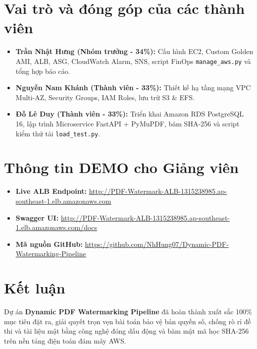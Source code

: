 \documentclass[12pt,a4paper]{report}
\begin{document}
\section{Vai trò và đóng góp của các thành viên}
\begin{itemize}
    \item \textbf{Trần Nhật Hưng (Nhóm trưởng - 34\%):} Cấu hình EC2, Custom Golden AMI, ALB, ASG, CloudWatch Alarm, SNS, script FinOps \texttt{manage\_aws.py} và tổng hợp báo cáo.
    \item \textbf{Nguyễn Nam Khánh (Thành viên - 33\%):} Thiết kế hạ tầng mạng VPC Multi-AZ, Security Groups, IAM Roles, lưu trữ S3 \& EFS.
    \item \textbf{Đỗ Lê Duy (Thành viên - 33\%):} Triển khai Amazon RDS PostgreSQL 16, lập trình Microservice FastAPI + PyMuPDF, băm SHA-256 và script kiểm thử tải \texttt{load\_test.py}.
\end{itemize}

\section{Thông tin DEMO cho Giảng viên}
\begin{itemize}
    \item \textbf{Live ALB Endpoint:} \url{http://PDF-Watermark-ALB-1315238985.ap-southeast-1.elb.amazonaws.com}
    \item \textbf{Swagger UI:} \url{http://PDF-Watermark-ALB-1315238985.ap-southeast-1.elb.amazonaws.com/docs}
    \item \textbf{Mã nguồn GitHub:} \url{https://github.com/NhHung07/Dynamic-PDF-Watermarking-Pipeline}
\end{itemize}

\section*{Kết luận}
Dự án \textbf{Dynamic PDF Watermarking Pipeline} đã hoàn thành xuất sắc 100\% mục tiêu đặt ra, giải quyết trọn vẹn bài toán bảo vệ bản quyền số, chống rò rỉ đề thi và tài liệu mật bằng công nghệ đóng dấu động và băm mật mã học SHA-256 trên nền tảng điện toán đám mây AWS.
\end{document}
